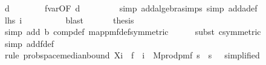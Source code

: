 \begin{isabellebody}
\ d{\isacharunderscore}{\kern0pt}{}\isanewline
\ \ \ \ \ \ \isamarkupfalse%
\ f{}{\isacharunderscore}{\kern0pt}var{\isacharbrackleft}{\kern0pt}OF\ d{\isacharunderscore}{\kern0pt}{}{\isacharbrackright}{\kern0pt}\ \isanewline
\ \ \ \ \ \ \isamarkupfalse%
\ {\isacharparenleft}{\kern0pt}simp\ add{\isacharcolon}{\kern0pt}algebra{\isacharunderscore}{\kern0pt}simps{\isacharcomma}{\kern0pt}\ simp\ add{\isacharcolon}{\kern0pt}a{\isacharunderscore}{\kern0pt}def{\isacharparenright}{\kern0pt}\isanewline
\ \ \ \ \isamarkupfalse%
\ \isamarkupfalse%
\ {\isachardoublequoteopen}{\isacharquery}{\kern0pt}lhs\ i\ {\isasymle}\ {}{\isacharslash}{\kern0pt}{}{\isachardoublequoteclose}\isanewline
\ \ \ \ \ \ \isamarkupfalse%
\ blast\isanewline
\ \ \isamarkupfalse%
\isanewline
\isanewline
\ \ \isamarkupfalse%
\ {\isacharquery}{\kern0pt}thesis\isanewline
\ \ \ \ \isamarkupfalse%
\ {\isacharparenleft}{\kern0pt}simp\ add{\isacharcolon}{\kern0pt}\ b\ comp{\isacharunderscore}{\kern0pt}def\ map{\isacharunderscore}{\kern0pt}pmf{\isacharunderscore}{\kern0pt}def{\isacharbrackleft}{\kern0pt}symmetric{\isacharbrackright}{\kern0pt}{\isacharparenright}{\kern0pt}\isanewline
\ \ \ \ \isamarkupfalse%
\ {\isacharparenleft}{\kern0pt}subst\ c{\isacharbrackleft}{\kern0pt}symmetric{\isacharbrackright}{\kern0pt}{\isacharparenright}{\kern0pt}\isanewline
\ \ \ \ \isamarkupfalse%
\ {\isacharparenleft}{\kern0pt}simp\ add{\isacharcolon}{\kern0pt}f{\isacharprime}{\kern0pt}{\isacharunderscore}{\kern0pt}def{\isacharparenright}{\kern0pt}\isanewline
\ \ \ \ \isamarkupfalse%
\ {\isacharparenleft}{\kern0pt}rule\ prob{\isacharunderscore}{\kern0pt}space{\isachardot}{\kern0pt}median{\isacharunderscore}{\kern0pt}bound{\isacharunderscore}{\kern0pt}{}{\isacharbrackleft}{\kern0pt}\ X{\isacharequal}{\kern0pt}{\isachardoublequoteopen}{\isasymlambda}i\ {\isasymomega}{\isachardot}{\kern0pt}\ f{}\ {\isasymomega}\ i{\isachardoublequoteclose}\ \ M{\isacharequal}{\kern0pt}{\isachardoublequoteopen}{\isacharparenleft}{\kern0pt}prod{\isacharunderscore}{\kern0pt}pmf\ {\isacharparenleft}{\kern0pt}{\isacharbraceleft}{\kern0pt}{}{\isachardot}{\kern0pt}{\isachardot}{\kern0pt}{\isacharless}{\kern0pt}s\ {\isasymtimes}\ {\isacharbraceleft}{\kern0pt}{}{\isachardot}{\kern0pt}{\isachardot}{\kern0pt}{\isacharless}{\kern0pt}s\ {\isacharparenleft}{\kern0pt}{\isasymlambda}{\isacharunderscore}{\kern0pt}{\isachardot}{\kern0pt}\ {\isasymOmega}{\isacharparenright}{\kern0pt}{\isacharparenright}{\kern0pt}{\isachardoublequoteclose}{\isacharcomma}{\kern0pt}\ simplified{\isacharbrackright}{\kern0pt}{\isacharparenright}{\kern0pt}\isanewline

\end{isabellebody}

